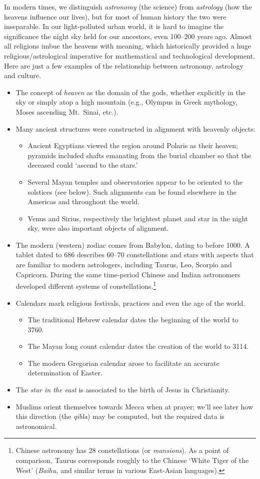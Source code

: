 In modern times, we distinguish \emph{astronomy} (the science) from \emph{astrology} (how the heavens influence our lives), but for most of human history the two were inseparable.  In our light-polluted urban world, it is hard to imagine the significance the night sky held for our ancestors, even 100--200 years ago. Almost all religions imbue the heavens with meaning, which historically provided a huge religious/astrological imperative for mathematical and technological development. Here are just a few examples of the relationship between astronomy, astrology and culture.
\begin{itemize}\itemsep0pt
	\item The concept of \emph{heaven} as the domain of the gods, whether explicitly in the sky or simply atop a high mountain (e.g., Olympus in Greek mythology, Moses ascending Mt.\ Sinai, etc.).
	\item Many ancient structures were constructed in alignment with heavenly objects:
	\begin{itemize}
	  \item Ancient Egyptians viewed the region around Polaris as their heaven; pyramids included shafts emanating from the burial chamber so that the deceased could `ascend to the stars.' 
		\item Several Mayan temples and observatories appear to be oriented to the solstices (see below). Such alignments can be found elsewhere in the Americas and throughout the world.
		\item Venus and Sirius, respectively the brightest planet and star in the night sky, were also important objects of alignment.
	\end{itemize}
	\item The modern (western) zodiac comes from Babylon, dating to before 1000\BC. A tablet dated to 686\BC{} describes 60--70 constellations and stars with aspects that are familiar to modern astrologers, including Taurus, Leo, Scorpio and Capricorn. During the same time-period Chinese and Indian astronomers developed different systems of constellations.\footnote{Chinese astronomy has 28 constellations (or \emph{mansions}). As a point of comparison, Taurus corresponds roughly to the Chinese `White Tiger of the West' (\emph{Baihu,} and similar terms in various East-Asian languages).}
	\item Calendars mark religious festivals, practices and even the age of the world.
	\begin{itemize}
	  \item The traditional Hebrew calendar dates the beginning of the world to 3760\BC.
	  \item The Mayan long count calendar dates the creation of the world to 3114\BC.
	  \item The modern Gregorian calendar arose to facilitate an accurate determination of Easter.
	\end{itemize}
	\item The \emph{star in the east} is associated to the birth of Jesus in Christianity.
	\item Muslims orient themselves towards Mecca when at prayer; we'll see later how this direction (the \emph{qibla}) may be computed, but the required data is astronomical.
\end{itemize}
